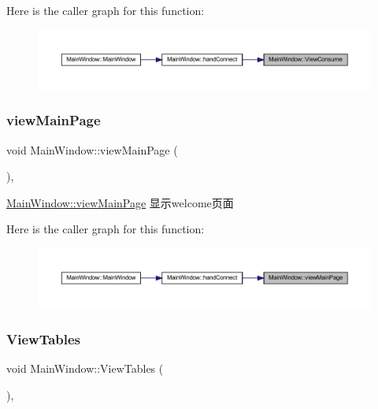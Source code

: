 Here is the caller graph for this function\+:
\nopagebreak
\begin{figure}[H]
\begin{center}
\leavevmode
\includegraphics[width=350pt]{class_main_window_a0d17e2ebc098f3d11f2074378c8aaebc_icgraph}
\end{center}
\end{figure}
\mbox{\label{class_main_window_a436dc8be6b93d1c347e5422fb3550a0b}} 
\subsubsection{\texorpdfstring{viewMainPage}{viewMainPage}}
{\footnotesize\ttfamily void Main\+Window\+::view\+Main\+Page (\begin{DoxyParamCaption}{ }\end{DoxyParamCaption})\hspace{0.3cm}{\ttfamily [private]}, {\ttfamily [slot]}}



\mbox{\hyperlink{class_main_window_a436dc8be6b93d1c347e5422fb3550a0b}{Main\+Window\+::view\+Main\+Page}} 显示welcome页面 

Here is the caller graph for this function\+:
\nopagebreak
\begin{figure}[H]
\begin{center}
\leavevmode
\includegraphics[width=350pt]{class_main_window_a436dc8be6b93d1c347e5422fb3550a0b_icgraph}
\end{center}
\end{figure}
\mbox{\label{class_main_window_a9a567ed8fe2074af6b1b276972dddfbd}} 
\subsubsection{\texorpdfstring{ViewTables}{ViewTables}}
{\footnotesize\ttfamily void Main\+Window\+::\+View\+Tables (\begin{DoxyParamCaption}{ }\end{DoxyParamCaption})\hspace{0.3cm}{\ttfamily [private]}, {\ttfamily [slot]}}



